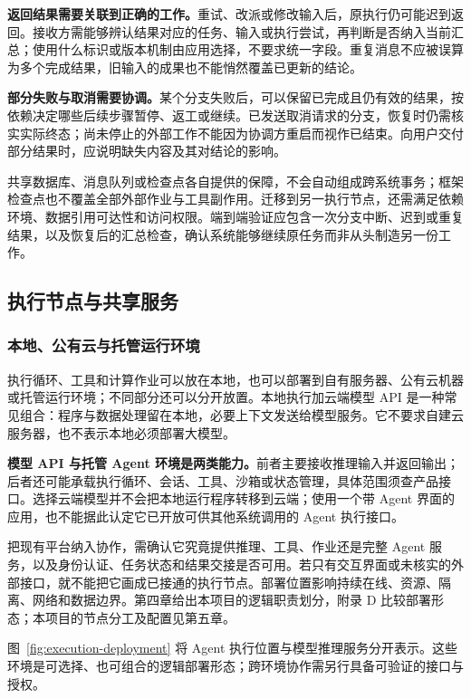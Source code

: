 \documentclass[11pt,a4paper]{article}
\begin{document}
\textbf{返回结果需要关联到正确的工作。}重试、改派或修改输入后，原执行仍可能迟到返回。接收方需能够辨认结果对应的任务、输入或执行尝试，再判断是否纳入当前汇总；使用什么标识或版本机制由应用选择，不要求统一字段。重复消息不应被误算为多个完成结果，旧输入的成果也不能悄然覆盖已更新的结论。

\textbf{部分失败与取消需要协调。}某个分支失败后，可以保留已完成且仍有效的结果，按依赖决定哪些后续步骤暂停、返工或继续。已发送取消请求的分支，恢复时仍需核实实际终态；尚未停止的外部工作不能因为协调方重启而视作已结束。向用户交付部分结果时，应说明缺失内容及其对结论的影响。

共享数据库、消息队列或检查点各自提供的保障，不会自动组成跨系统事务；框架检查点也不覆盖全部外部作业与工具副作用。迁移到另一执行节点，还需满足依赖环境、数据引用可达性和访问权限。端到端验证应包含一次分支中断、迟到或重复结果，以及恢复后的汇总检查，确认系统能够继续原任务而非从头制造另一份工作。

\subsection{执行节点与共享服务}

\subsubsection{本地、公有云与托管运行环境}

执行循环、工具和计算作业可以放在本地，也可以部署到自有服务器、公有云机器或托管运行环境；不同部分还可以分开放置。本地执行加云端模型 API 是一种常见组合：程序与数据处理留在本地，必要上下文发送给模型服务。它不要求自建云服务器，也不表示本地必须部署大模型。

\textbf{模型 API 与托管 Agent 环境是两类能力。}前者主要接收推理输入并返回输出；后者还可能承载执行循环、会话、工具、沙箱或状态管理，具体范围须查产品接口。选择云端模型并不会把本地运行程序转移到云端；使用一个带 Agent 界面的应用，也不能据此认定它已开放可供其他系统调用的 Agent 执行接口。

把现有平台纳入协作，需确认它究竟提供推理、工具、作业还是完整 Agent 服务，以及身份认证、任务状态和结果交接是否可用。若只有交互界面或未核实的外部接口，就不能把它画成已接通的执行节点。部署位置影响持续在线、资源、隔离、网络和数据边界。第四章给出本项目的逻辑职责划分，附录 D 比较部署形态；本项目的节点分工及配置见第五章。

图~\ref{fig:execution-deployment} 将 Agent 执行位置与模型推理服务分开表示。这些环境是可选择、也可组合的逻辑部署形态；跨环境协作需另行具备可验证的接口与授权。
\end{document}
